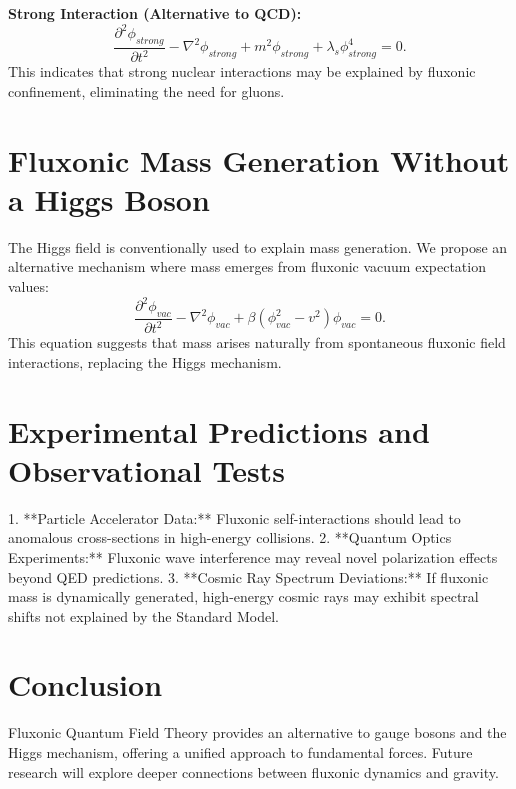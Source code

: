 \documentclass{article}
\begin{document}
\textbf{Strong Interaction (Alternative to QCD):}
\begin{equation}
    \frac{\partial^2 \phi_{strong}}{\partial t^2} - \nabla^2 \phi_{strong} + m^2 \phi_{strong} + \lambda_s \phi_{strong}^4 = 0.
\end{equation}
This indicates that strong nuclear interactions may be explained by fluxonic confinement, eliminating the need for gluons.

\section{Fluxonic Mass Generation Without a Higgs Boson}
The Higgs field is conventionally used to explain mass generation. We propose an alternative mechanism where mass emerges from fluxonic vacuum expectation values:
\begin{equation}
    \frac{\partial^2 \phi_{vac}}{\partial t^2} - \nabla^2 \phi_{vac} + \beta (\phi_{vac}^2 - v^2) \phi_{vac} = 0.
\end{equation}
This equation suggests that mass arises naturally from spontaneous fluxonic field interactions, replacing the Higgs mechanism.

\section{Experimental Predictions and Observational Tests}
1. **Particle Accelerator Data:** Fluxonic self-interactions should lead to anomalous cross-sections in high-energy collisions.
2. **Quantum Optics Experiments:** Fluxonic wave interference may reveal novel polarization effects beyond QED predictions.
3. **Cosmic Ray Spectrum Deviations:** If fluxonic mass is dynamically generated, high-energy cosmic rays may exhibit spectral shifts not explained by the Standard Model.

\section{Conclusion}
Fluxonic Quantum Field Theory provides an alternative to gauge bosons and the Higgs mechanism, offering a unified approach to fundamental forces. Future research will explore deeper connections between fluxonic dynamics and gravity.
\end{document}
